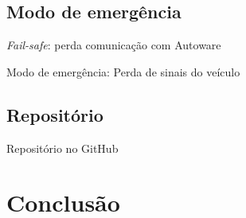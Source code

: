 \documentclass{if-beamer}
\begin{document}
\subsection*{Modo de emergência}

\begin{frame}{\textit{Fail-safe}: perda comunicação com Autoware}
	

\end{frame}

\begin{frame}{Modo de emergência: Perda de sinais do veículo}
	

\end{frame}

\subsection*{Repositório}

\begin{frame}{Repositório no GitHub}
	
	
	
\end{frame}


\section{Conclusão}
\end{document}
